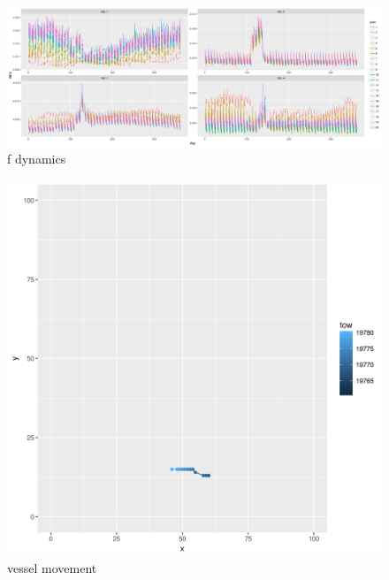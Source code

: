 \documentclass[review]{elsarticle}
\begin{document}
\begin{figure}[!ht]
	\includegraphics[width = \linewidth]{../tests/plots/fDynamics}
	\caption{f dynamics}
	\label{fig:3}
\end{figure}	

\begin{figure}[!ht]
	\includegraphics[width = \linewidth]{../tests/plots/vessel_move}
	\caption{vessel movement}
	\label{fig:4}
\end{figure}	
\end{document}
